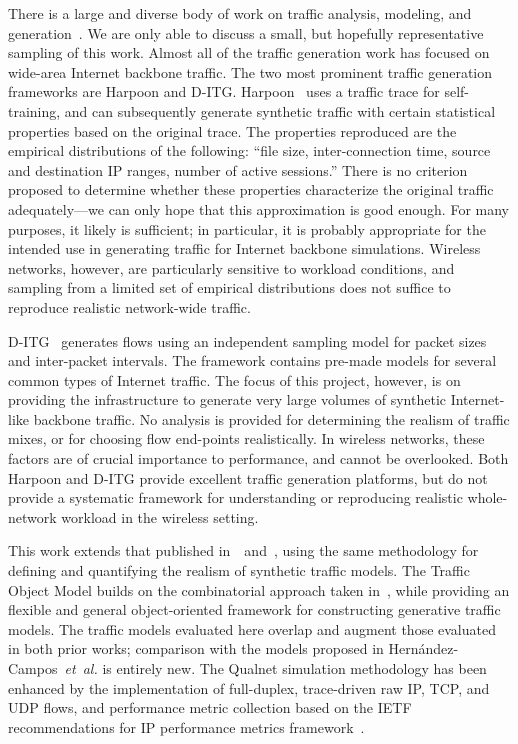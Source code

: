 \documentclass[conference]{IEEEtran}
\newcommand{\caps}[1]{{\small{#1}}}
\newcommand{\FHC}{Hern\'andez-Campos~\textit{et~al.}}
\begin{document}
There is a large and diverse body of work on traffic analysis, modeling, and generation~\cite{Paxson95,Paxson96,Sommers04,Avallone04,Hernandez06:dissertation}. We are only able to discuss a small, but hopefully representative sampling of this work. Almost all of the traffic generation work has focused on wide-area Internet backbone traffic.
The two most prominent traffic generation frameworks are Harpoon and \caps{D-ITG}. Harpoon~\cite{Sommers04} uses a traffic trace for self-training, and can subsequently generate synthetic traffic with certain statistical properties based on the original trace. The properties reproduced are the empirical distributions of the following: ``file size, inter-connection time, source and destination IP ranges, number of active sessions.'' There is no criterion proposed to determine whether these properties characterize the original traffic adequately---we can only hope that this approximation is good enough. For many purposes, it likely is sufficient; in particular, it is probably appropriate for the intended use in generating traffic for Internet backbone simulations. Wireless networks, however, are particularly sensitive to workload conditions, and sampling from a limited set of empirical distributions does not suffice to reproduce realistic network-wide traffic.

\caps{D-ITG}~\cite{Avallone04} generates flows using an independent sampling model for packet sizes and inter-packet intervals. The framework contains pre-made models for several common types of Internet traffic. The focus of this project, however, is on providing the infrastructure to generate very large volumes of synthetic Internet-like backbone traffic. No analysis is provided for determining the realism of traffic mixes, or for choosing flow end-points realistically. In wireless networks, these factors are of crucial importance to performance, and cannot be overlooked. Both Harpoon and \caps{D-ITG} provide excellent traffic generation platforms, but do not provide a systematic framework for understanding or reproducing realistic whole-network workload in the wireless setting.

This work extends that published in~\cite{Karpinski07:realism}~and~\cite{Karpinski07:cbr-failure}, using the same methodology for defining and quantifying the realism of synthetic traffic models. The Traffic Object Model builds on the combinatorial approach taken in~\cite{Karpinski07:cbr-failure}, while providing an flexible and general object-oriented framework for constructing generative traffic models. The traffic models evaluated here overlap and augment those evaluated in both prior works; comparison with the models proposed in {\FHC} is entirely new. The Qualnet simulation methodology has been enhanced by the implementation of full-duplex, trace-driven raw \caps{IP}, \caps{TCP}, and \caps{UDP} flows, and performance metric collection based on the \caps{IETF} recommendations for \caps{IP} performance metrics framework~\cite{rfc:ip-metrics,rfc:jitter}.
\end{document}
